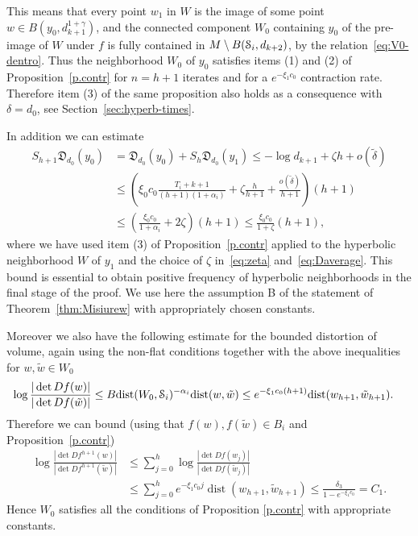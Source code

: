 \documentclass[reqno,12pt,a4paper]{amsart}
\theoremstyle{plain}
\theoremstyle{definition}
\begin{document}
This means that every point $w_1$ in $W$ is the image of
some point $w\in B(y_0,d_{k+1}^{1+\gamma})$, and the
connected component $W_0$ containing $y_0$ of the pre-image
of $W$ under $f$ is fully contained in $M\setminus
B({\EuScript{S}}_i,d_{k+2})$, by the relation~\eqref{eq:V0-dentro}.
  Thus the neighborhood $W_0$ of $y_0$ satisfies items (1)
  and (2) of Proposition~\ref{p.contr} for $n=h+1$ iterates
  and for a $e^{-\xi_1 c_0}$ contraction rate.  Therefore item (3)
  of the same proposition also holds as a consequence with
  $\delta=d_0$, see Section~\ref{sec:hyperb-times}.

  In addition we can estimate
  \begin{align}
    S_{h+1}{{\mathfrak D}}_{d_0}(y_0)
    &=
    {{\mathfrak D}}_{d_0}(y_0) + S_h{{\mathfrak D}}_{d_0}(y_1)
    \le
    -\log d_{k+1} + \zeta h + o(\tilde\delta)\nonumber
    \\
    &\le
    \left( \xi_0 c_0 \frac{T_i+k+1}{(h+1)(1+\alpha_i)}
     +\zeta\frac{h}{h+1} + \frac{o(\tilde\delta)}{h+1}
   \right) (h+1)\nonumber
   \\
   &\le
   \left(\frac{\xi_0 c_0}{1+\alpha_i} + 2\zeta\right)(h+1)
   \le
   \frac{\xi_0 c_0}{1+\zeta} (h+1)  , \label{eq:SR}
   
  \end{align}
  where we have used item (3) of Proposition~\ref{p.contr}
  applied to the hyperbolic neighborhood $W$ of $y_1$ and
  the choice of $\zeta$ in~\eqref{eq:zeta}
  and~\eqref{eq:Daverage}. 
  This bound is essential to obtain positive frequency of
  hyperbolic neighborhoods in the final stage of the
  proof. We use here the assumption B of the statement
  of Theorem~\ref{thm:Misiurew} with appropriately chosen
  constants.

  Moreover we also have the following estimate for the
  bounded distortion of volume, again using the non-flat
  conditions together with the above inequalities
  for $w,\tilde w\in W_0$
  \begin{align*}
    \log\frac{|\det Df(w)|}{|\det Df(\tilde w)|}
    &\le
    B {\operatorname{dist}}(W_0,{\EuScript{S}}_i)^{-\alpha_i} {\operatorname{dist}}(w,\tilde w)
    \le
    e^{-\xi_1 c_0 (h+1)}{\operatorname{dist}}(w_{h+1},\tilde w_{h+1}).
  \end{align*}
  Therefore we can bound (using that $f(w),f(\tilde w)\in
  B_i$ and Proposition~\ref{p.contr})
  \begin{align*}
    \log\frac{|\det Df^{h+1}(w)|}{|\det Df^{h+1}(\tilde w)|}
    &\le
    \sum_{j=0}^{h} \log\frac{|\det Df(w_j)|}{|\det
      Df(\tilde w_j)|}
    \\
    &\le
    \sum_{j=0}^{h} e^{-\xi_1 c_0 j}
    {\operatorname{dist}}(w_{h+1},\tilde w_{h+1} )
    \le \frac{\delta_3}{1-e^{-\xi_1 c_0}} = C_1.
  \end{align*}
  Hence $W_0$ satisfies all the conditions  of
  Proposition \ref{p.contr} with appropriate constants.
\end{document}
